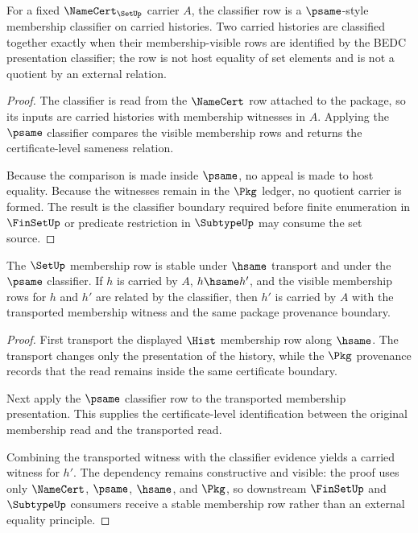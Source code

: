 \begin{theorem}
\label{thm:set-classifier-obligation}
For a fixed $\NameCert_{\SetUp}$ carrier $A$, the classifier row is a $\psame$-style membership classifier on carried histories. Two carried histories are classified together exactly when their membership-visible rows are identified by the BEDC presentation classifier; the row is not host equality of set elements and is not a quotient by an external relation.
\end{theorem}
\begin{proof}
The classifier is read from the $\NameCert$ row attached to the package, so its inputs are carried histories with membership witnesses in $A$. Applying the $\psame$ classifier compares the visible membership rows and returns the certificate-level sameness relation.

Because the comparison is made inside $\psame$, no appeal is made to host equality. Because the witnesses remain in the $\Pkg$ ledger, no quotient carrier is formed. The result is the classifier boundary required before finite enumeration in $\FinSetUp$ or predicate restriction in $\SubtypeUp$ may consume the set source.
\end{proof}

\begin{theorem}
\label{thm:set-membership-transport-obligation}
The $\SetUp$ membership row is stable under $\hsame$ transport and under the $\psame$ classifier. If $h$ is carried by $A$, $h \hsame h'$, and the visible membership rows for $h$ and $h'$ are related by the classifier, then $h'$ is carried by $A$ with the transported membership witness and the same package provenance boundary.
\end{theorem}
\begin{proof}
First transport the displayed $\Hist$ membership row along $\hsame$. The transport changes only the presentation of the history, while the $\Pkg$ provenance records that the read remains inside the same certificate boundary.

Next apply the $\psame$ classifier row to the transported membership presentation. This supplies the certificate-level identification between the original membership read and the transported read.

Combining the transported witness with the classifier evidence yields a carried witness for $h'$. The dependency remains constructive and visible: the proof uses only $\NameCert$, $\psame$, $\hsame$, and $\Pkg$, so downstream $\FinSetUp$ and $\SubtypeUp$ consumers receive a stable membership row rather than an external equality principle.
\end{proof}

